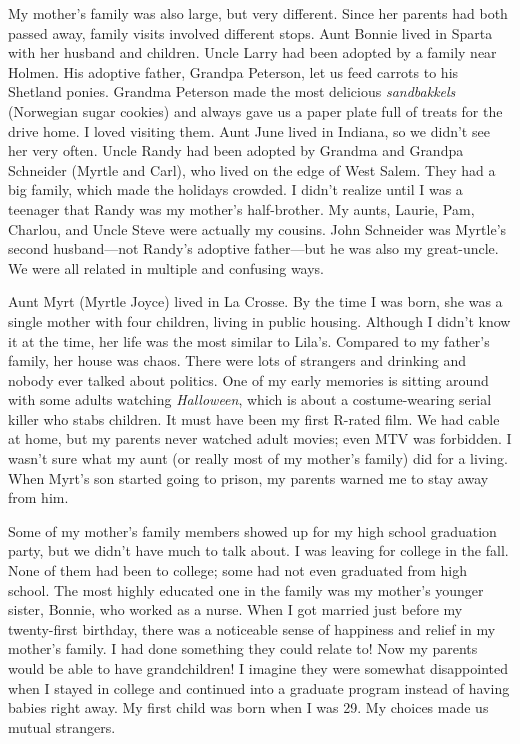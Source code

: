 \documentclass[
  american,
  letterpaper,
]{book}
\begin{document}
My mother's family was also large, but very different. Since her parents
had both passed away, family visits involved different stops. Aunt
Bonnie lived in Sparta with her husband and children. Uncle Larry had
been adopted by a family near Holmen. His adoptive father, Grandpa
Peterson, let us feed carrots to his Shetland ponies. Grandma Peterson
made the most delicious \emph{sandbakkels} (Norwegian sugar cookies) and
always gave us a paper plate full of treats for the drive home. I loved
visiting them. Aunt June lived in Indiana, so we didn't see her very
often. Uncle Randy had been adopted by Grandma and Grandpa Schneider
(Myrtle and Carl), who lived on the edge of West Salem. They had a big
family, which made the holidays crowded. I didn't realize until I was a
teenager that Randy was my mother's half-brother. My aunts, Laurie, Pam,
Charlou, and Uncle Steve were actually my cousins. John Schneider was
Myrtle's second husband---not Randy's adoptive father---but he was also
my great-uncle. We were all related in multiple and confusing ways.

Aunt Myrt (Myrtle Joyce) lived in La Crosse. By the time I was born, she
was a single mother with four children, living in public housing.
Although I didn't know it at the time, her life was the most similar to
Lila's. Compared to my father's family, her house was chaos. There were
lots of strangers and drinking and nobody ever talked about politics.
One of my early memories is sitting around with some adults watching
\emph{Halloween}, which is about a costume-wearing serial killer who
stabs children. It must have been my first R-rated film. We had cable at
home, but my parents never watched adult movies; even MTV was forbidden.
I wasn't sure what my aunt (or really most of my mother's family) did
for a living. When Myrt's son started going to prison, my parents warned
me to stay away from him.

Some of my mother's family members showed up for my high school
graduation party, but we didn't have much to talk about. I was leaving
for college in the fall. None of them had been to college; some had not
even graduated from high school. The most highly educated one in the
family was my mother's younger sister, Bonnie, who worked as a nurse.
When I got married just before my twenty-first birthday, there was a
noticeable sense of happiness and relief in my mother's family. I had
done something they could relate to! Now my parents would be able to
have grandchildren! I imagine they were somewhat disappointed when I
stayed in college and continued into a graduate program instead of
having babies right away. My first child was born when I was 29. My
choices made us mutual strangers.
\end{document}
